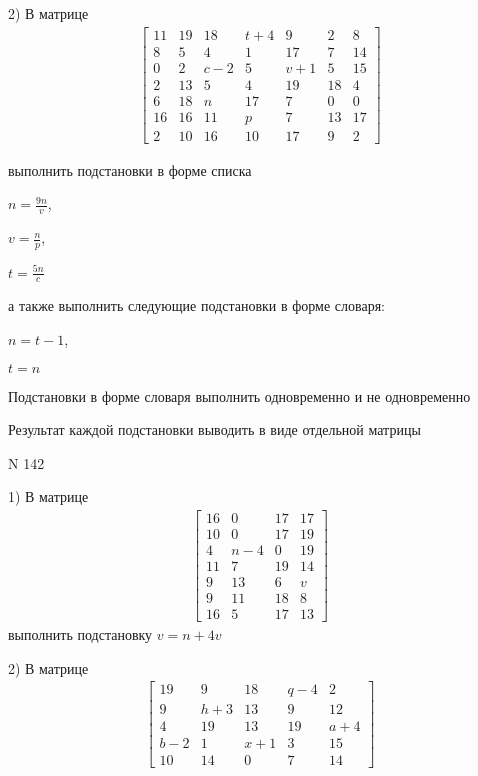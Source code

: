 \documentclass[11pt]{report}
\begin{document}
    2) В матрице
\begin{align*}
\left[\begin{matrix}11 & 19 & 18 & t + 4 & 9 & 2 & 8\\8 & 5 & 4 & 1 & 17 & 7 & 14\\0 & 2 & c - 2 & 5 & v + 1 & 5 & 15\\2 & 13 & 5 & 4 & 19 & 18 & 4\\6 & 18 & n & 17 & 7 & 0 & 0\\16 & 16 & 11 & p & 7 & 13 & 17\\2 & 10 & 16 & 10 & 17 & 9 & 2\end{matrix}\right]
\end{align*}

выполнить подстановки в форме списка

$n=\frac{9 n}{v}$,

$v=\frac{n}{p}$,

$t=\frac{5 n}{c}$

а также выполнить следующие подстановки в форме словаря:

$n=t - 1$,

$t=n$


    Подстановки в форме словаря выполнить одновременно и не одновременно


    Результат каждой подстановки выводить в виде отдельной матрицы

\newpage
N 142


    1) В матрице
\begin{align*}
\left[\begin{matrix}16 & 0 & 17 & 17\\10 & 0 & 17 & 19\\4 & n - 4 & 0 & 19\\11 & 7 & 19 & 14\\9 & 13 & 6 & v\\9 & 11 & 18 & 8\\16 & 5 & 17 & 13\end{matrix}\right]
\end{align*}
выполнить подстановку $v=n + 4 v$


    2) В матрице
\begin{align*}
\left[\begin{matrix}19 & 9 & 18 & q - 4 & 2\\9 & h + 3 & 13 & 9 & 12\\4 & 19 & 13 & 19 & a + 4\\b - 2 & 1 & x + 1 & 3 & 15\\10 & 14 & 0 & 7 & 14\end{matrix}\right]
\end{align*}
\end{document}

